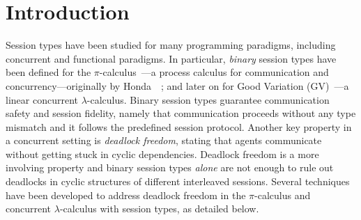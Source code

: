 \documentclass[main.tex]{subfiles}
\begin{document}
\section{Introduction}
Session types have been studied for many programming paradigms, including concurrent and functional paradigms. In particular, \emph{binary} session types have been defined for the $\pi$-calculus~\cite{sangiorgiwalker01}---a process calculus for communication and concurrency---originally by Honda~\etal~\cite{honda93,takeuchihonda94,hondavasconcelos98}; and later on for Good Variation (GV)~\cite{wadler15,lindleymorris15}---a linear concurrent $\lambda$-calculus.
Binary session types guarantee communication safety and session fidelity, namely that communication proceeds without any type mismatch and it follows the predefined session protocol.
Another key property in a concurrent setting is \emph{deadlock freedom}, stating that agents communicate without getting stuck in cyclic dependencies. Deadlock freedom is a more involving property and binary session types \emph{alone} are not enough to rule out deadlocks in cyclic structures of different interleaved sessions. Several techniques have been developed to address deadlock freedom in the $\pi$-calculus and concurrent $\lambda$-calculus with session types, as detailed below.
\end{document}
